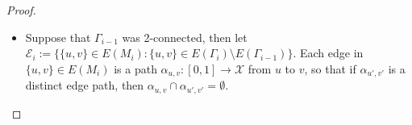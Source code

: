 \documentclass{article}
\numberwithin{equation}{section}
\theoremstyle{definition}
\theoremstyle{remark}
\begin{document}
\begin{proof}
\begin{itemize}
        \item Suppose that $\Gamma_{i-1}$ was 2-connected, then let $\mathcal{E}_i:=\{\{u,v\}\in E(M_i): \{u,v\}\in E(\Gamma_i)\setminus E(\Gamma_{i-1})\}$. Each edge in $\{u,v\}\in E(M_i)$ is a path $\alpha_{u,v}:[0,1]\rightarrow \mathcal{X}$ from $u$ to $v$, so that if $\alpha_{u',v'}$ is a distinct edge path, then $\alpha_{u,v}\cap\alpha_{u',v'}=\emptyset$. 

\end{itemize}
\end{proof}
\end{document}
